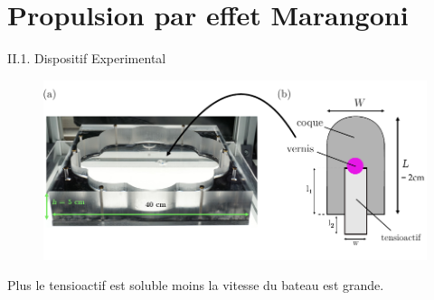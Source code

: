 \documentclass[aspectratio=169,10pt]{beamer}
\begin{document}
\section{Propulsion par effet Marangoni}

\begin{frame}{II.1. Dispositif Experimental}
  \begin{minipage}{.6\linewidth}
    \begin{figure}
        \centering
        \includegraphics[width=.9\linewidth]{./figures/Dispositif_Exp_Bateau_Marangoni_v2.pdf}\\
    \end{figure}
  \end{minipage}
  \begin{minipage}{.35\linewidth}
    \begin{table}
      \centering
      \caption{Tableau des vitesses initiales}
    \end{table}
    \begin{ombretheo}
      \begin{theo}
        Plus le tensioactif est soluble moins la vitesse du bateau est grande.
      \end{theo}
    \end{ombretheo}
  \end{minipage}
\end{frame}
\end{document}
